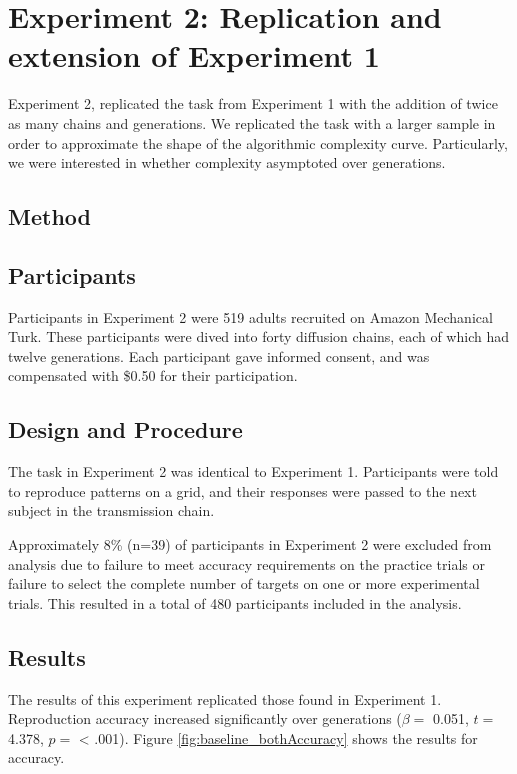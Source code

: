 \documentclass[10pt, letterpaper]{article}
\begin{document}
\section{Experiment 2: Replication and extension of Experiment
1}\label{experiment-2-replication-and-extension-of-experiment-1}

Experiment 2, replicated the task from Experiment 1 with the addition of
twice as many chains and generations. We replicated the task with a
larger sample in order to approximate the shape of the algorithmic
complexity curve. Particularly, we were interested in whether complexity
asymptoted over generations.

\subsection{Method}\label{method-1}

\subsection{Participants}\label{participants-1}

Participants in Experiment 2 were 519 adults recruited on Amazon
Mechanical Turk. These participants were dived into forty diffusion
chains, each of which had twelve generations. Each participant gave
informed consent, and was compensated with \$0.50 for their
participation.

\subsection{Design and Procedure}\label{design-and-procedure-1}

The task in Experiment 2 was identical to Experiment 1. Participants
were told to reproduce patterns on a grid, and their responses were
passed to the next subject in the transmission chain.

Approximately 8\% (n=39) of participants in Experiment 2 were excluded
from analysis due to failure to meet accuracy requirements on the
practice trials or failure to select the complete number of targets on
one or more experimental trials. This resulted in a total of 480
participants included in the analysis.

\subsection{Results}\label{results-1}

The results of this experiment replicated those found in Experiment 1.
Reproduction accuracy increased significantly over generations
(\(\beta =\) 0.051, \(t =\) 4.378, \(p =\) \textless{} .001). Figure
\ref{fig:baseline_bothAccuracy} shows the results for accuracy.
\end{document}
